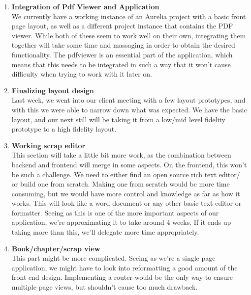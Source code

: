 \documentclass[onecolumn, draftclsnofoot,10pt, compsoc]{IEEEtran}
\begin{document}
\begin{enumerate}
    \item
    \textbf{Integration of Pdf Viewer and Application} \\
	We currently have a working instance of an Aurelia project with a basic front page layout, 
	as well as a different project instance that contains the PDF viewer. While both of these
	seem to work well on their own, integrating them together will take some time and massaging 
	in order to obtain the desired functionality. The pdfviewer is an essential part of the 
	application, which means that this needs to be integrated in such a way that it won't cause
	difficulty when trying to work with it later on. \\

    \item
    \textbf{Finalizing layout design} \\

	Last week, we went into our client meeting with a few layout prototypes, and with this we 
	were able to narrow down what was expected. We have the basic layout, and our next still 
	will be taking it from a low/mid level fidelity prototype to a high fidelity layout. \\

	\item
	\textbf{Working scrap editor} \\

	This section will take a little bit more work, as the combination between backend and 
	frontend will merge in some aspects. On the frontend, this won't be such a challenge. 
	We need to either find an open source rich text editor/ or build one from scratch. 
	Making one from scratch would be more time consuming, but we would have more control
	and knowledge as far as how it works. This will look like a word document or any other 
	basic text editor or formatter. Seeing as this is one of the more important aspects of 
	our application, we’re approximating it to take around 4 weeks. If it ends up taking more 
	than this, we’ll delegate more time appropriately. \\

	\item
	\textbf{Book/chapter/scrap view} \\

	This part might be more complicated. Seeing as we're a single page application, we might 
	have to look into reformatting a good amount of the front end design. Implementing a router 
	would be the only way to ensure multiple page views, but shouldn't cause too much drawback. \\


\end{enumerate}
\end{document}
